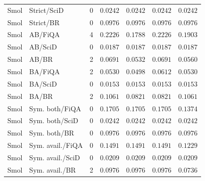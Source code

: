 \begin{longtable}{@{}llrrrrr@{}}
Smol & Strict/SciD & 0 & $0.0242$ & $0.0242$ & $0.0242$ & $0.0242$ \\
Smol & Strict/BR & 0 & $0.0976$ & $0.0976$ & $0.0976$ & $0.0976$ \\
\addlinespace[3pt]
Smol & AB/FiQA & 4 & $0.2226$ & $0.1788$ & $0.2226$ & $0.1903$ \\
Smol & AB/SciD & 0 & $0.0187$ & $0.0187$ & $0.0187$ & $0.0187$ \\
Smol & AB/BR & 2 & $0.0691$ & $0.0532$ & $0.0691$ & $0.0560$ \\
\addlinespace[3pt]
Smol & BA/FiQA & 2 & $0.0530$ & $0.0498$ & $0.0612$ & $0.0530$ \\
Smol & BA/SciD & 0 & $0.0153$ & $0.0153$ & $0.0153$ & $0.0153$ \\
Smol & BA/BR & 2 & $0.1061$ & $0.0821$ & $0.0821$ & $0.1061$ \\
\addlinespace[3pt]
Smol & Sym. both/FiQA & 0 & $0.1705$ & $0.1705$ & $0.1705$ & $0.1374$ \\
Smol & Sym. both/SciD & 0 & $0.0242$ & $0.0242$ & $0.0242$ & $0.0242$ \\
Smol & Sym. both/BR & 0 & $0.0976$ & $0.0976$ & $0.0976$ & $0.0976$ \\
\addlinespace[3pt]
Smol & Sym. avail./FiQA & 0 & $0.1491$ & $0.1491$ & $0.1491$ & $0.1229$ \\
Smol & Sym. avail./SciD & 0 & $0.0209$ & $0.0209$ & $0.0209$ & $0.0209$ \\
Smol & Sym. avail./BR & 2 & $0.0976$ & $0.0976$ & $0.0976$ & $0.0736$ \\
\bottomrule\end{longtable}